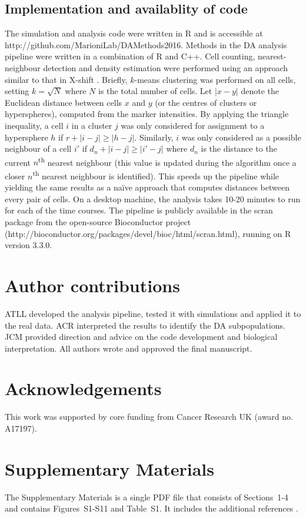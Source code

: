 \documentclass{article}
\newcommand{\suppannotate}{4}
\newcommand{\suppfigclustersim}{S11}
\begin{document}
\subsection{Implementation and availablity of code}
The simulation and analysis code were written in R and is accessible at {http://\-github.com/\-MarioniLab/\-DAMethods2016}.
Methods in the DA analysis pipeline were written in a combination of R and C++.
Cell counting, nearest-neighbour detection and density estimation were performed using an approach similar to that in X-shift \cite{samusik2016automated}.
Briefly, $k$-means clustering was performed on all cells, setting $k=\sqrt{N}$ where $N$ is the total number of cells.
Let $|x-y|$ denote the Euclidean distance between cells $x$ and $y$ (or the centres of clusters or hyperspheres), computed from the marker intensities.
By applying the triangle inequality, a cell $i$ in a cluster $j$ was only considered for assignment to a hypersphere $h$ if $r + |i-j| \ge |h-j|$.
Similarly, $i$ was only considered as a possible neighbour of a cell $i'$ if $d_n + |i-j| \ge |i'-j|$ where $d_n$ is the distance to the current $n$\textsuperscript{th} nearest neighbour (this value is updated during the algorithm once a closer $n$\textsuperscript{th} nearest neighbour is identified).
This speeds up the pipeline while yielding the same results as a na\"ive approach that computes distances between every pair of cells.
On a desktop machine, the analysis takes 10-20 minutes to run for each of the time courses.
The pipeline is publicly available in the scran package from the open-source Bioconductor project \cite{gentleman2004bioconductor} (http://\-bioconductor.org\-/packages\-/devel\-/bioc\-/html\-/\-scran.html), running on R version 3.3.0. 

\section{Author contributions}
ATLL developed the analysis pipeline, tested it with simulations and applied it to the real data. 
ACR interpreted the results to identify the DA subpopulations.
JCM provided direction and advice on the code development and biological interpretation.
All authors wrote and approved the final manuscript.

\section{Acknowledgements}
This work was supported by core funding from Cancer Research UK (award no. A17197).

\section{Supplementary Materials}
The Supplementary Materials is a single PDF file that consists of Sections~1-\suppannotate{} and contains Figures~S1-\suppfigclustersim{} and Table~S1.
It includes the additional references \cite{benjamini1997multiple,robinson2010scaling,mccarthy2009treat}.



\end{document}
